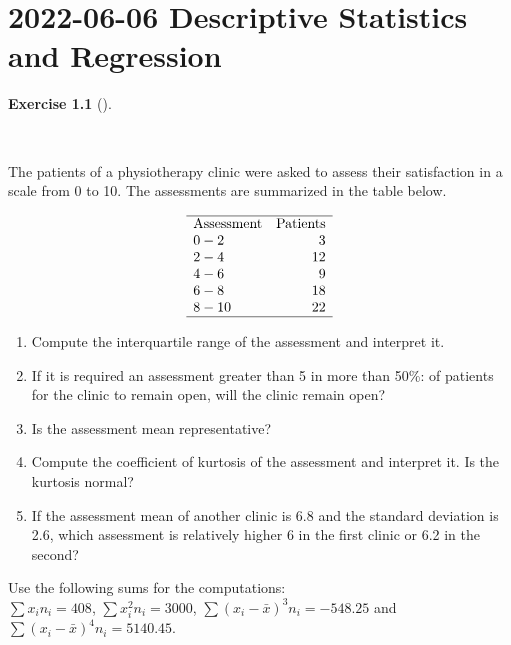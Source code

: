 \documentclass[
  a4paper,
]{scrreport}
\theoremstyle{definition}
\newtheorem{exercise}{Exercise}[chapter]
\theoremstyle{remark}
\begin{document}

\hypertarget{descriptive-statistics-and-regression-1}{%
\chapter{\texorpdfstring{2022-06-06 Descriptive Statistics and
Regression}{2022-06-06  Descriptive Statistics and Regression}}\label{descriptive-statistics-and-regression-1}}

\begin{exercise}[]\protect\hypertarget{exr-1}{}\label{exr-1}

~

The patients of a physiotherapy clinic were asked to assess their
satisfaction in a scale from 0 to 10. The assessments are summarized in
the table below.

\[
\begin{array}{lr} 
\hline
\mbox{Assessment} & \mbox{Patients}\\  
0 - 2 & 3\\
2 - 4 & 12\\  
4 - 6 & 9\\ 
6 - 8 & 18\\ 
8 - 10 & 22\\ 
\hline
\end{array}
\]

\begin{enumerate}
\def\labelenumi{\alph{enumi}.}
\item
  Compute the interquartile range of the assessment and interpret it.
\item
  If it is required an assessment greater than 5 in more than 50\%: of
  patients for the clinic to remain open, will the clinic remain open?
\item
  Is the assessment mean representative?
\item
  Compute the coefficient of kurtosis of the assessment and interpret
  it. Is the kurtosis normal?
\item
  If the assessment mean of another clinic is 6.8 and the standard
  deviation is 2.6, which assessment is relatively higher 6 in the first
  clinic or 6.2 in the second?
\end{enumerate}

Use the following sums for the computations:\\
\(\sum x_in_i=408\), \(\sum x_i^2n_i=3000\),
\(\sum (x_i-\bar x)^3n_i=-548.25\) and
\(\sum (x_i-\bar x)^4n_i=5140.45\).

\begin{tcolorbox}[enhanced jigsaw, colback=white, title=\textcolor{quarto-callout-tip-color}{\faLightbulb}\hspace{0.5em}{Solution}, arc=.35mm, colbacktitle=quarto-callout-tip-color!10!white, breakable, leftrule=.75mm, colframe=quarto-callout-tip-color-frame, opacitybacktitle=0.6, left=2mm, toptitle=1mm, bottomtitle=1mm, titlerule=0mm, rightrule=.15mm, bottomrule=.15mm, toprule=.15mm, opacityback=0, coltitle=black]


\end{tcolorbox}
\end{exercise}
\end{document}
